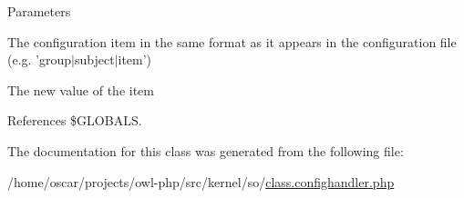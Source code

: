 \begin{DoxyParams}{Parameters}
\item[\mbox{\tt[in]} {\em \$item}]The configuration item in the same format as it appears in the configuration file (e.g. 'group$|$subject$|$item') \item[\mbox{\tt[in]} {\em \$value}]The new value of the item \end{DoxyParams}


References \$GLOBALS.



The documentation for this class was generated from the following file:\begin{DoxyCompactItemize}
\item 
/home/oscar/projects/owl-\/php/src/kernel/so/\hyperlink{class_8confighandler_8php}{class.confighandler.php}\end{DoxyCompactItemize}

